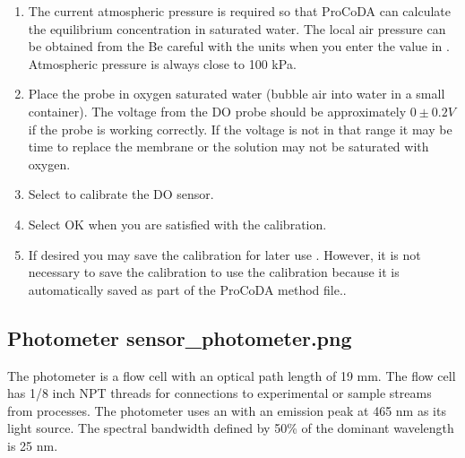 \documentclass[letterpaper,10pt,english]{sphinxmanual}
\begin{document}
\begin{enumerate}
\item {} 
The current atmospheric pressure is required so that ProCoDA can calculate the equilibrium concentration in saturated water. The local air pressure can be obtained from the  Be careful with the units when you enter the value in . Atmospheric pressure is always close to 100 kPa.

\item {} 
Place the probe in oxygen saturated water (bubble air into water in a small container).  The voltage from the DO probe should be approximately \(0 \pm 0.2 V\) if the probe is working correctly. If the voltage is not in that range it may be time to replace the membrane or the solution may not be saturated with oxygen.

\item {} 
Select  to calibrate the DO sensor.

\item {} 
Select OK when you are satisfied with the calibration.

\item {} 
If desired you may save the calibration for later use . However, it is not necessary to save the calibration to use the calibration because it is automatically saved as part of the ProCoDA method file..

\end{enumerate}


\subsection[Photometer]{Photometer \lowercase{\sphinxincludegraphics}{{sensor_photometer}.png}}
\label{\detokenize{ProCoDA/ProCoDA:photometer-sensor-photometer}}\label{\detokenize{ProCoDA/ProCoDA:heading-procoda-photometer}}
The photometer is a flow cell with an optical path length of 19 mm. The flow cell has 1/8 inch NPT threads for connections to experimental or sample streams from processes. The photometer uses an  with an emission peak at 465 nm as its light source. The spectral bandwidth defined by 50\% of the dominant wavelength is 25 nm.

%
\begin{sphinxVerbatim}[commandchars=\\\{\}]
  
    
\end{sphinxVerbatim}
\end{document}
